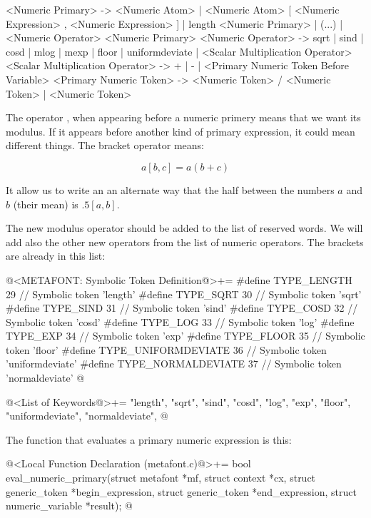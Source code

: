 \alinhaverbatim
<Numeric Primary> -> <Numeric Atom> |
                     <Numeric Atom> [ <Numeric Expression> ,
                                      <Numeric Expression> ] |
                     length <Numeric Primary> | (...) |
                     <Numeric Operator> <Numeric Primary>
<Numeric Operator> -> sqrt | sind | cosd | mlog | mexp | floor |
                       uniformdeviate |
                       <Scalar Multiplication Operator>
<Scalar Multiplication Operator> -> + | - |
                       <Primary Numeric Token Before Variable>
<Primary Numeric Token> -> <Numeric Token> / <Numeric Token> |
                           <Numeric Token>
\alinhanormal

The operator , when appearing before a numeric
primery means that we want its modulus. If it appears before another
kind of primary expression, it could mean different things. The
bracket operator means:

$$
a[b, c] = a(b+c)
$$

It allow us to write an an alternate way that the half between the
numbers $a$ and $b$ (their mean) is $.5[a, b]$.

The new modulus operator should be added to the list of reserved
words. We will add also the other new operators from the list of
numeric operators. The brackets are already in this list:

\iniciocodigo
@<METAFONT: Symbolic Token Definition@>+=
#define TYPE_LENGTH         29 // Symbolic token 'length'
#define TYPE_SQRT           30 // Symbolic token 'sqrt'
#define TYPE_SIND           31 // Symbolic token 'sind'
#define TYPE_COSD           32 // Symbolic token 'cosd'
#define TYPE_LOG            33 // Symbolic token 'log'
#define TYPE_EXP            34 // Symbolic token 'exp'
#define TYPE_FLOOR          35 // Symbolic token 'floor'
#define TYPE_UNIFORMDEVIATE 36 // Symbolic token 'uniformdeviate'
#define TYPE_NORMALDEVIATE  37 // Symbolic token 'normaldeviate'
@
\fimcodigo

\iniciocodigo
@<List of Keywords@>+=
"length", "sqrt", "sind", "cosd", "log", "exp", "floor", "uniformdeviate",
"normaldeviate",
@
\fimcodigo

The function that evaluates a primary numeric expression is this:

\iniciocodigo
@<Local Function Declaration (metafont.c)@>+=
bool eval_numeric_primary(struct metafont *mf, struct context *cx,
                          struct generic_token *begin_expression,
                          struct generic_token *end_expression,
                          struct numeric_variable *result);
@
\fimcodigo


